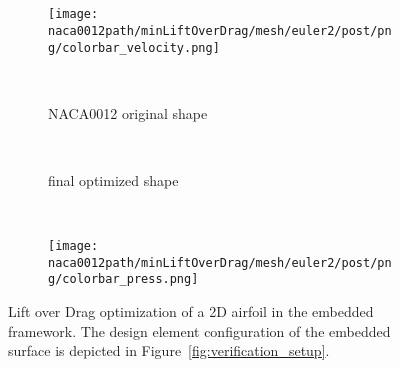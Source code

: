 \documentclass[../main.tex]{subfiles}
\def\naca0012path{/home/lukas/Desktop/project/independence/project/simulations/naca0012}
\begin{document}
\begin{figure}[t!]
    \centering
    	\begin{subfigure}[t]{0.40\textwidth}
    	    \setlength{\fboxsep}{\valfboxsep}%
        \setlength{\fboxrule}{\valfboxrule}%
		\end{subfigure}\hfill~
    	\begin{subfigure}[t]{0.40\textwidth}
    	    	\setlength{\fboxsep}{\valfboxsep}%
        \setlength{\fboxrule}{\valfboxrule}%
		\end{subfigure}~
    	\begin{subfigure}[t]{0.1\textwidth}
			  \texttt{[image: \\naca0012path/minLiftOverDrag/mesh/euler2/post/png/colorbar\_velocity.png]}
		\end{subfigure}\\\vspace{1cm}
    	\begin{subfigure}[t]{0.40\textwidth}
    	    \setlength{\fboxsep}{\valfboxsep}%
        \setlength{\fboxrule}{\valfboxrule}%
			  \caption{NACA0012 original shape}
		\end{subfigure}\hfill~
    	\begin{subfigure}[t]{0.40\textwidth}
    	    \setlength{\fboxsep}{\valfboxsep}%
        \setlength{\fboxrule}{\valfboxrule}%
			  \caption{final optimized shape}
		\end{subfigure}~
    	\begin{subfigure}[t]{0.1\textwidth}
			  \texttt{[image: \\naca0012path/minLiftOverDrag/mesh/euler2/post/png/colorbar\_press.png]}
		\end{subfigure}
    \caption[NACA0012 LDR optimization - solution fields]{Lift over Drag optimization of a 2D airfoil in the embedded framework. The design element configuration of the embedded surface is depicted in Figure~\ref{fig:verification_setup}.}
    \label{fig:naca0012_ldr_solutions}
\end{figure}
\end{document}
